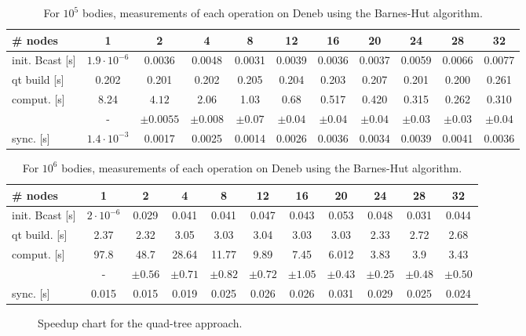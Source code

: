 \begin{table}[H]
  \begin{adjustwidth}{-1.5cm}{-1.5cm}   

\centering
\begin{tabular}{l|cccccccccc}
\# nodes & 1 & 2 & 4 & 8 & 12 & 16 & 20 & 24 & 28 & 32\\
\hline init. Bcast [s] & $1.9\cdot10^{-6}$ & 0.0036 & 0.0048 & 0.0031 & 0.0039 & 0.0036 & 0.0037 & 0.0059 & 0.0066 & 0.0077\\
qt build [s] & 0.202 & 0.201 & 0.202 & 0.205 & 0.204 & 0.203 &0.207 & 0.201 & 0.200 & 0.261\\
comput. [s] & 8.24 & $4.12$ & 2.06 & 1.03 &  0.68  & 0.517 &0.420 & 0.315 & 0.262 & 0.310\\
& - & $\pm 0.0055$ & $\pm 0.008$ & $\pm0.07$ & $\pm 0.04$ & $\pm 0.04$ & $\pm0.04$ & $\pm0.03$ & $\pm0.03$ & $\pm 0.04$ \\
sync. [s] & $1.4\cdot 10^{-3}$ & 0.0017 & 0.0025 & 0.0014 & 0.0026 &  0.0036& 0.0034 & 0.0039 & 0.0041 & 0.0036\\
\end{tabular}
\caption{For $10^5$ bodies, measurements of each operation on Deneb using the Barnes-Hut algorithm.}
\label{tab:qt:10e5}
  \end{adjustwidth}

\end{table}

\begin{table}[H]
  \begin{adjustwidth}{-1.5cm}{-1.5cm}   

\centering
\begin{tabular}{l|cccccccccc}
\# nodes & 1 & 2 & 4 & 8 & 12 & 16 & 20 & 24 & 28 & 32\\
\hline init. Bcast [s] & $2\cdot10^{-6}$ & 0.029 & 0.041 & 0.041 & 0.047 & 0.043 & 0.053 & 0.048 & 0.031 & 0.044\\
qt build. [s] & 2.37 & 2.32 & 3.05 & 3.03 & 3.04 & 3.03 & 3.03 & 2.33 & 2.72 & 2.68\\
comput. [s] & 97.8 & 48.7 & 28.64 & 11.77 & 9.89 & 7.45 & 6.012 & 3.83 & 3.9 & 3.43 \\
& - & $\pm 0.56$ & $\pm 0.71$ & $\pm 0.82$ & $\pm 0.72$ & $\pm 1.05$ & $\pm 0.43$ & $\pm 0.25$ & $\pm 0.48$ & $\pm 0.50$  \\
sync. [s] & 0.015 & 0.015 & 0.019 & 0.025 & 0.026 & 0.026 & 0.031 & 0.029 & 0.025 &0.024\\
\end{tabular}
\caption{For $10^6$ bodies, measurements of each operation on Deneb using the Barnes-Hut algorithm.}
\label{tab:qt:10e6}
  \end{adjustwidth}

\end{table}


\begin{figure}[H]

\caption{Speedup chart for the quad-tree approach.}
\end{figure}
